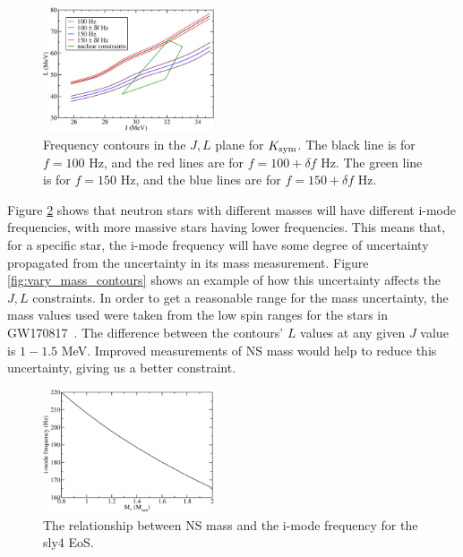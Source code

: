 \documentclass[fleqn,usenatbib]{mnras}
\begin{document}
\begin{figure}
\centering
\includegraphics[width=0.45\textwidth,angle=0]{f100_f150_tres_2.pdf}
\caption{Frequency contours in the $J,L$ plane for $K_{\rm sym}$. The black line is for $f=100$ Hz, and the red lines are for $f=100+\delta f$ Hz. The green line is for $f=150$ Hz, and the blue lines are for $f=150+\delta f$ Hz.}
\label{fig:t_res_spread}
\end{figure}

\hspace{\parindent}Figure \ref{fig:M_vs_f} shows that neutron stars with different masses will have different i-mode frequencies, with more massive stars having lower frequencies. This means that, for a specific star, the i-mode frequency will have some degree of uncertainty propagated from the uncertainty in its mass measurement. Figure \ref{fig:vary_mass_contours} shows an example of how this uncertainty affects the $J,L$ constraints. In order to get a reasonable range for the mass uncertainty, the mass values used were taken from the low spin ranges for the stars in GW170817~\citet{abbott2017merger}. The difference between the contours' $L$ values at any given $J$ value is $1-1.5$ MeV. Improved measurements of NS mass would help to reduce this uncertainty, giving us a better constraint.

\begin{figure}
\centering
\includegraphics[width=0.45\textwidth,angle=0]{M_vs_f}
\caption{The relationship between NS mass and the i-mode frequency for the sly4 EoS.}
\label{fig:M_vs_f}
\end{figure}
\end{document}
